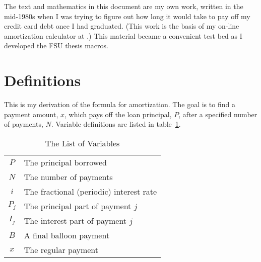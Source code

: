 The text and mathematics in this document are my own work, written in
the mid-1980s when I was trying to figure out how long it would take
to pay off my credit card debt once I had graduated.  (This work is
the basis of my on-line amortization calculator at
.)  This
material became a convenient test bed as I developed the FSU thesis
macros.

\section{Definitions}
This is my derivation of the formula for amortization.  The goal is to
find a payment amount, $x$, which pays off the loan principal, $P$,
after a specified number of payments, $N$.  Variable definitions are
listed in table~\ref{tab:varlist}.



\begin{table}[htbp]
\caption{The List of Variables\label{tab:varlist}}
\begin{center}
\begin{tabular}{cl}
$P$&The principal borrowed\\
$N$&The number of payments\\
$i$&The fractional (periodic) interest rate\\
$P_j$&The principal part of payment $j$\\
$I_j$&The interest part of payment $j$\\
$B$&A final balloon payment\\
$x$&The regular payment
\end{tabular}
\end{center}
\end{table}

